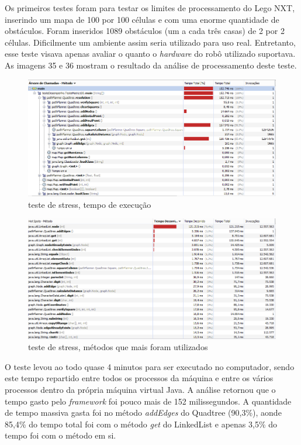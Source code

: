 Os primeiros testes foram para testar os limites de processamento do Lego NXT, inserindo um mapa de 100 por 100 células e com uma enorme quantidade de obstáculos. Foram inseridos 1089 obstáculos (um a cada três casas) de 2 por 2 células. Dificilmente um ambiente assim seria utilizado para uso real. Entretanto, esse teste visava apenas avaliar o quanto o \textit{hardware} do robô utilizado suportava. As imagens 35 e 36 mostram o resultado da análise de processamento deste teste.

\begin{figure}[h]
	\centering
	\label{fig35}
		\includegraphics[keepaspectratio=true,scale=0.6]{figuras/teste100_1.PNG}
	\caption{teste de stress, tempo de execução}
\end{figure}

\begin{figure}[h]
	\centering
	\label{fig36}
		\includegraphics[keepaspectratio=true,scale=0.6]{figuras/teste100_2.PNG}
	\caption{teste de stress, métodos que mais foram utilizados}
\end{figure}

O teste levou ao todo quase 4 minutos para ser executado no computador, sendo este tempo repartido entre todos os processos da máquina e entre os vários processos dentro da própria máquina virtual Java. A análise retornou que o tempo gasto pelo \textit{framework} foi pouco mais de 152 milissegundos. A quantidade de tempo massiva gasta foi no método \textit{addEdges} do Quadtree (90,3\%), aonde 85,4\% do tempo total foi com o método \textit{get} do LinkedList e apenas 3,5\% do tempo foi com o método em si.


